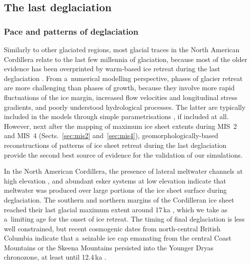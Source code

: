 \documentclass[tc, manuscript]{copernicus}
\begin{document}
\subsection{The last deglaciation}

\subsubsection{Pace and patterns of deglaciation}

      Similarly to other glaciated regions, most glacial traces in the North
      American Cordillera relate to the last few millennia of glaciation,
      because most of the older evidence has been overprinted by warm-based
      ice retreat during the last deglaciation \citep{Kleman.1994,
      Kleman.etal.2010}. From a~numerical modelling perspective, phases of
      glacier retreat are more challenging than phases of growth, because
      they involve more rapid fluctuations of the ice margin, increased flow
      velocities and longitudinal stress gradients, and poorly understood
      hydrological processes. The latter are typically included in the
      models through simple parametrisations
      \citep[e.g.][]{Clason.etal.2012, Clason.etal.2014, Bueler.Pelt.2015},
      if included at all. However, next after the mapping of maximum ice
      sheet extents during MIS~2 and MIS~4 (Sects.~\ref{sec:mis2}
      and~\ref{sec:mis4}), geomorphologically-based reconstructions of
      patterns of ice sheet retreat during the last deglaciation provide the
      second best source of evidence for the validation of our simulations.


      In the North American Cordillera, the presence of lateral meltwater
      channels at high elevation \citep{Margold.etal.2011,
      Margold.etal.2013a, Margold.etal.2014}, and abundant esker systems at
      low elevation \citep{Burke.etal.2012, Burke.etal.2012a,
      Perkins.etal.2013, Margold.etal.2013} indicate that meltwater was
      produced over large portions of the ice sheet surface during
      deglaciation. The southern and northern margins of the Cordilleran ice
      sheet reached their last glacial maximum extent around 17\,\unit{ka}
      \citep[Sect.~\ref{sec:timing};][]{Porter.Swanson.1998,
      Cosma.etal.2008, Stroeven.etal.2010, Stroeven.etal.2014}, which we
      take as a~limiting age for the onset of ice retreat. The timing of
      final deglaciation is less well constrained, but recent cosmogenic
      dates from north-central British Columbia indicate that a~seizable ice
      cap emanating from the central Coast Mountains or the Skeena Mountains
      persisted into the Younger Dryas chronozone, at least until
      12.4\,\unit{ka} \citep{Margold.etal.2014}.
\end{document}
